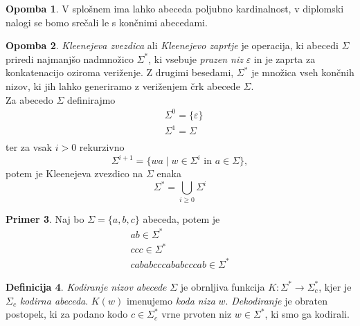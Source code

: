\documentclass{amsart}
\theoremstyle{definition} %
\newtheorem{definicija}{Definicija}[section]
\newtheorem{primer}[definicija]{Primer}
\newtheorem{opomba}[definicija]{Opomba}
\theoremstyle{plain} %
\begin{document}
\begin{opomba}
    
    V splošnem ima lahko abeceda poljubno kardinalnost, v diplomski nalogi se bomo srečali le
    s končnimi abecedami.
    
\end{opomba}

\begin{opomba}
    
    \textit{Kleenejeva zvezdica} ali \textit{Kleenejevo zaprtje} je operacija, ki
    abecedi $ \Sigma $ priredi najmanjšo nadmnožico $ \Sigma^* $, ki vsebuje
    \textit{prazen niz} $ \varepsilon $ in je zaprta za konkatenacijo oziroma veriženje.
    Z drugimi besedami, $ \Sigma^* $ je množica vseh končnih nizov, ki
    jih lahko generiramo z veriženjem črk abecede $ \Sigma $. \\
    Za abecedo $ \Sigma $ definirajmo
    \begin{align*}
        & \Sigma^0 = \{ \varepsilon \} \\
        & \Sigma^1 = \Sigma \\
    \end{align*}
    ter za vsak $ i > 0 $ rekurzivno
    \[
        \Sigma^{i+1} = \{ wa \mid w \in \Sigma^i \text{ in } a \in \Sigma \},
    \]
    potem je Kleenejeva zvezdico na $ \Sigma $ enaka
    \[
        \Sigma^* = \bigcup_{i \geq 0} \Sigma^i
    \]

\end{opomba}



\begin{primer}
    
    Naj bo $ \Sigma = \{ a,b,c \} $ abeceda, potem je
    \begin{gather*} 
        ab \in \Sigma^* \\
        ccc \in \Sigma^* \\
        cababcccababcccab \in \Sigma^*
    \end{gather*}

\end{primer}

\begin{definicija}
    
    \textit{Kodiranje nizov abecede} $ \Sigma $ je obrnljiva funkcija $ K \colon \Sigma^* \to \Sigma_c^* $,
    kjer je $ \Sigma_c $ \textit{kodirna abeceda}. $ K(w) $ imenujemo \textit{koda niza} $ w $.
    \textit{Dekodiranje} je obraten postopek, ki za podano kodo $ c \in \Sigma_c^* $ vrne prvoten niz
    $ w \in \Sigma^* $, ki smo ga kodirali.

\end{definicija}
\end{document}
